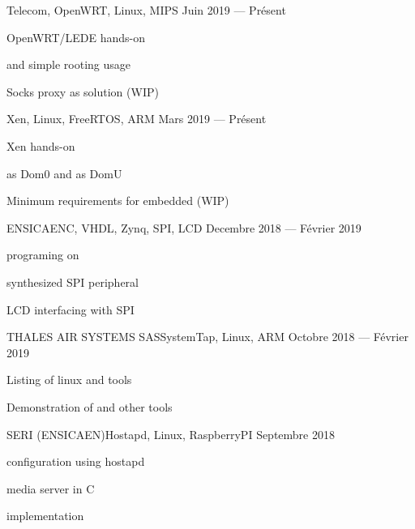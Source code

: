 
    {}{Telecom, OpenWRT, Linux, MIPS}
    {Juin 2019 --- Présent}
    {%
        \begin{additems}
            \item OpenWRT/LEDE  hands-on
            \item {} and simple rooting usage
            \item Socks proxy as  solution (WIP)
        \end{additems}
    }

    {}{Xen, Linux, FreeRTOS, ARM}
    {Mars 2019 --- Présent}
    {%
        \begin{additems}
            \item Xen  hands-on
            \item {} as Dom0 and  as DomU
            \item Minimum requirements for embedded (WIP)
        \end{additems}
    }

    {ENSICAEN}{C, VHDL, Zynq, SPI, LCD}
    {Decembre 2018 --- Février 2019}
    {%
        \begin{additems}
            \item {} programing on 
            \item {} synthesized SPI peripheral
            \item LCD interfacing with SPI
        \end{additems}
    }

    {THALES AIR SYSTEMS SAS}{SystemTap, Linux, ARM}
    {Octobre 2018 --- Février 2019}
    {%
        \begin{additems}
            \item Listing of linux  and  tools
            \item Demonstration of  and other tools
        \end{additems}
    }

    {SERI (ENSICAEN)}{Hostapd, Linux, RaspberryPI}
    {Septembre 2018}
    {%
        \begin{additems}
            \item {} configuration using hostapd
            \item {} media server in C
            \item {} implementation
        \end{additems}
    }
